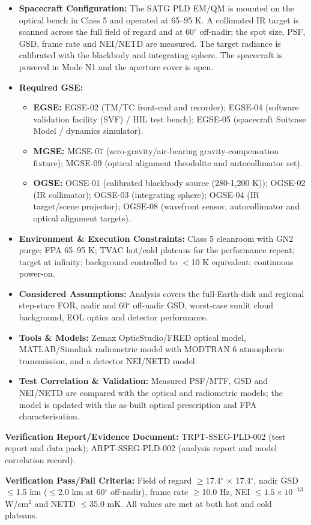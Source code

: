 \begin{itemize}
\item \textbf{Spacecraft Configuration:} The SATG PLD EM/QM is mounted on the optical bench in Class 5 and operated at 65--95 K. A collimated IR target is scanned across the full field of regard and at 60$^\circ$ off-nadir; the spot size, PSF, GSD, frame rate and NEI/NETD are measured. The target radiance is calibrated with the blackbody and integrating sphere. The spacecraft is powered in Mode N1 and the aperture cover is open.
\item \textbf{Required GSE:}
\begin{itemize}
\item \textbf{EGSE:} EGSE-02 (TM/TC front-end and recorder); EGSE-04 (software validation facility (SVF) / HIL test bench); EGSE-05 (spacecraft Suitcase Model / dynamics simulator).
\item \textbf{MGSE:} MGSE-07 (zero-gravity/air-bearing gravity-compensation fixture); MGSE-09 (optical alignment theodolite and autocollimator set).
\item \textbf{OGSE:} OGSE-01 (calibrated blackbody source (280-1,200 K)); OGSE-02 (IR collimator); OGSE-03 (integrating sphere); OGSE-04 (IR target/scene projector); OGSE-08 (wavefront sensor, autocollimator and optical alignment targets).
\end{itemize}
\item \textbf{Environment \& Execution Constraints:} Class 5 cleanroom with GN2 purge; FPA 65--95 K; TVAC hot/cold plateaus for the performance repeat; target at infinity; background controlled to $<$10 K equivalent; continuous power-on.
\item \textbf{Considered Assumptions:} Analysis covers the full-Earth-disk and regional step-stare FOR, nadir and 60$^\circ$ off-nadir GSD, worst-case sunlit cloud background, EOL optics and detector performance.
\item \textbf{Tools \& Models:} Zemax OpticStudio/FRED optical model, MATLAB/Simulink radiometric model with MODTRAN 6 atmospheric transmission, and a detector NEI/NETD model.
\item \textbf{Test Correlation \& Validation:} Measured PSF/MTF, GSD and NEI/NETD are compared with the optical and radiometric models; the model is updated with the as-built optical prescription and FPA characterisation.
\end{itemize}
\par\textbf{Verification Report/Evidence Document:} TRPT-SSEG-PLD-002 (test report and data pack); ARPT-SSEG-PLD-002 (analysis report and model correlation record).
\par\textbf{Verification Pass/Fail Criteria:} Field of regard $\ge$17.4$^\circ$ $\times$ 17.4$^\circ$, nadir GSD $\le$1.5 km ($\le$2.0 km at 60$^\circ$ off-nadir), frame rate $\ge$10.0 Hz, NEI $\le$$1.5\times10^{-13}$ W/cm$^2$ and NETD $\le$35.0 mK. All values are met at both hot and cold plateaus.
\par\medskip

